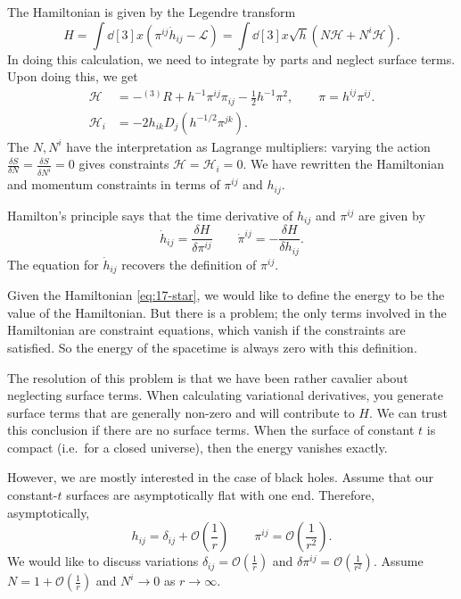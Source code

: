 
The Hamiltonian is given by the Legendre transform
\begin{equation}
  H = \int \dd[3]{x} (\pi^{ij} \dot{h}_{ij} - \mathscr{L}) = \int \dd[3]{x} \sqrt{h} (N \mathcal{H} + N^{i} \mathcal{H}) \label{eq:17-star}.
\end{equation}
In doing this calculation, we need to integrate by parts and neglect surface terms. Upon doing this, we get
\begin{align}
  \mathcal{H} &= - {}^(3) R + h^{-1} \pi^{ij} \pi_{ij} - \frac{1}{2} h^{-1} \pi^2, \qquad \pi = h^{ij} \pi^{ij}. \\
  \mathcal{H}_i &= - 2 h_{ik} D_{j} (h^{-1 / 2} \pi^{jk}).
\end{align}
The $N, N^{i}$ have the interpretation as Lagrange multipliers: varying the action $\frac{\delta S}{\delta N} = \frac{\delta S}{\delta N^{i}} = 0$ gives constraints $\mathcal{H} = \mathcal{H}_i = 0$.
We have rewritten the Hamiltonian and momentum constraints in terms of $\pi^{ij}$ and $h_{ij}$.

Hamilton's principle says that the time derivative of $h_{ij}$ and $\pi^{ij}$ are given by
\begin{equation}
  \dot{h}_{ij} = \frac{\delta H}{\delta \pi^{ij}} \qquad \dot{\pi}^{ij} =- \frac{\delta H}{\delta h_{ij}} \label{eq:17-dag}.
\end{equation}
The equation for $\dot{h}_{ij}$ recovers the definition of $\pi^{ij}$.

Given the Hamiltonian \eqref{eq:17-star}, we would like to define the energy to be the value of the Hamiltonian.
But there is a problem; the only terms involved in the Hamiltonian are constraint equations, which vanish if the constraints are satisfied.
So the energy of the spacetime is always zero with this definition.

The resolution of this problem is that we have been rather cavalier about neglecting surface terms.
When calculating variational derivatives, you generate surface terms that are generally non-zero and will contribute to $H$.
We can trust this conclusion if there are no surface terms. When the surface of constant $t$ is compact (i.e.~for a closed universe), then the energy vanishes exactly.

However, we are mostly interested in the case of black holes. Assume that our constant-$t$ surfaces are asymptotically flat with one end.
Therefore, asymptotically,
\begin{equation}
  h_{ij} = \delta_{ij} + \mathcal{O}\left(\frac{1}{r}\right) \qquad \pi^{ij} = \mathcal{O} \left( \frac{1}{r^2} \right).
\end{equation}
We would like to discuss variations $\delta_{ij} = \mathcal{O} \left( \frac{1}{r} \right)$ and $\delta \pi^{ij} = \mathcal{O} \left( \frac{1}{r^2} \right)$.
Assume $N =1 + \mathcal{O} \left( \frac{1}{r} \right)$ and $N^{i} \to 0$ as $r \to \infty$.

